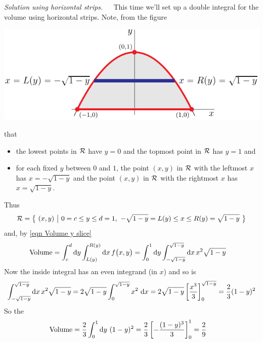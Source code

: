 \begin{eg}[Volume]
\medskip\noindent\emph{Solution using horizontal strips.}\ \ \
This time we'll set up a double integral for the volume using horizontal strips.  
Note, from the figure 
\begin{efig}
\begin{center}
   \includegraphics{dblIntV0c.pdf}
\end{center}
\end{efig}
that
\begin{itemize}
\item
the lowest points in $\mathcal{R}$ have $y=0$ and the topmost point
in $\mathcal{R}$ has $y=1$ and
\item 
for each fixed $y$ between $0$ and $1$, the point $(x,y)$ in $\mathcal{R}$
with the leftmost $x$ has $x=-\sqrt{1-y}$ and the point $(x,y)$ in $\mathcal{R}$
with the rightmost $x$ has $x=\sqrt{1-y}$.
\end{itemize}
Thus
\begin{equation*}
\cR=\Set{(x,y)}{0=c\le y\le d=1,\ 
        -\sqrt{1-y}= L(y)\le x\le R(y) = \sqrt{1-y}}
\end{equation*}
and, by \eqref{eqn Volume y slice}
\begin{align*}
\text{Volume} &= \int_c^d \mathrm{d}y \int_{L(y)}^{R(y)} \mathrm{d}x\, f\big(x,y\big) 
    = \int_0^1 \mathrm{d}y \int_{-\sqrt{1-y}}^{\sqrt{1-y}} \mathrm{d}x\, x^2\sqrt{1-y} 
\end{align*}
Now the inside integral has an even integrand (in $x$) and so is
\begin{align*}
\int_{-\sqrt{1-y}}^{\sqrt{1-y}} \mathrm{d}x\, x^2\sqrt{1-y}
=2\sqrt{1-y}\int_0^{\sqrt{1-y}} x^2\ \mathrm{d}x
=2\sqrt{1-y} \left[ \frac{x^3}{3} \right]_0^{\sqrt{1-y}}
=\frac{2}{3}(1-y)^2
\end{align*}
So the
\begin{align*}
\text{Volume} &= \frac{2}{3}\int_0^1 \mathrm{d}y\  (1-y)^2
        =\frac{2}{3}\left[-\frac{(1-y)^3}{3}\right]_0^1 
        =\frac{2}{9}
\end{align*} 
\end{eg}


